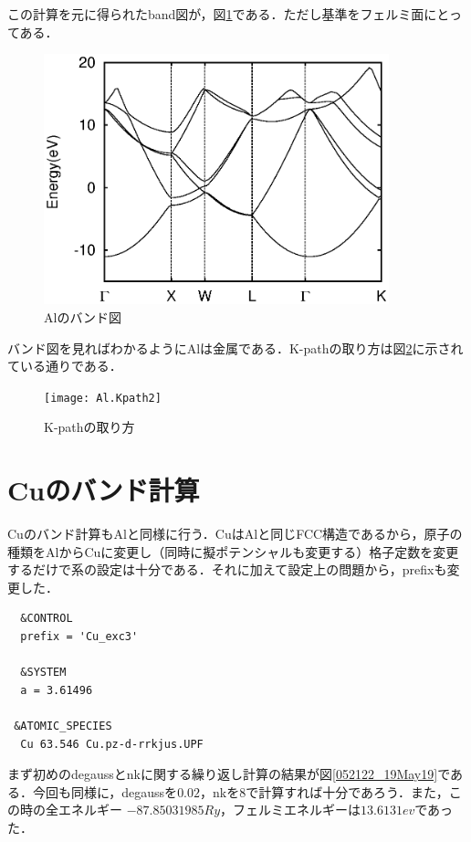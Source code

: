 \documentclass[a4j]{jarticle}
\begin{document}
この計算を元に得られたband図が，図\ref{033638_19May19}である．ただし基準をフェルミ面にとってある．
\begin{figure}[htb]
 \begin{center}
  \includegraphics[width=10cm]{Al.bands.eps}
  \caption{Alのバンド図}
  \label{033638_19May19}
 \end{center}
\end{figure}
バンド図を見ればわかるようにAlは金属である．K-pathの取り方は図\ref{044438_19May19}に示されている通りである．

\begin{figure}[htb]
 \begin{center}
  \texttt{[image: Al.Kpath2]}
  \caption{K-pathの取り方}
  \label{044438_19May19}
 \end{center}
\end{figure}
\newpage


\section{Cuのバンド計算}

Cuのバンド計算もAlと同様に行う．CuはAlと同じFCC構造であるから，原子の種類をAlからCuに変更し（同時に擬ポテンシャルも変更する）格子定数を変更するだけで系の設定は十分である．それに加えて設定上の問題から，prefixも変更した．
 \begin{lstlisting}
  &CONTROL
  prefix = 'Cu_exc3'
  
  &SYSTEM
  a = 3.61496
  
 &ATOMIC_SPECIES
  Cu 63.546 Cu.pz-d-rrkjus.UPF 
 \end{lstlisting}

 まず初めのdegaussとnkに関する繰り返し計算の結果が図\ref{052122_19May19}である．今回も同様に，degaussを$0.02$，nkを$8$で計算すれば十分であろう．また，この時の全エネルギー
 $-87.85031985 Ry$，フェルミエネルギーは$13.6131 ev$であった．
 
\end{document}
